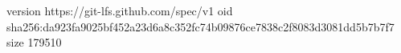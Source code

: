 version https://git-lfs.github.com/spec/v1
oid sha256:da923fa9025bf452a23d6a8c352fc74b09876ce7838c2f8083d3081dd5b7b7f7
size 179510
